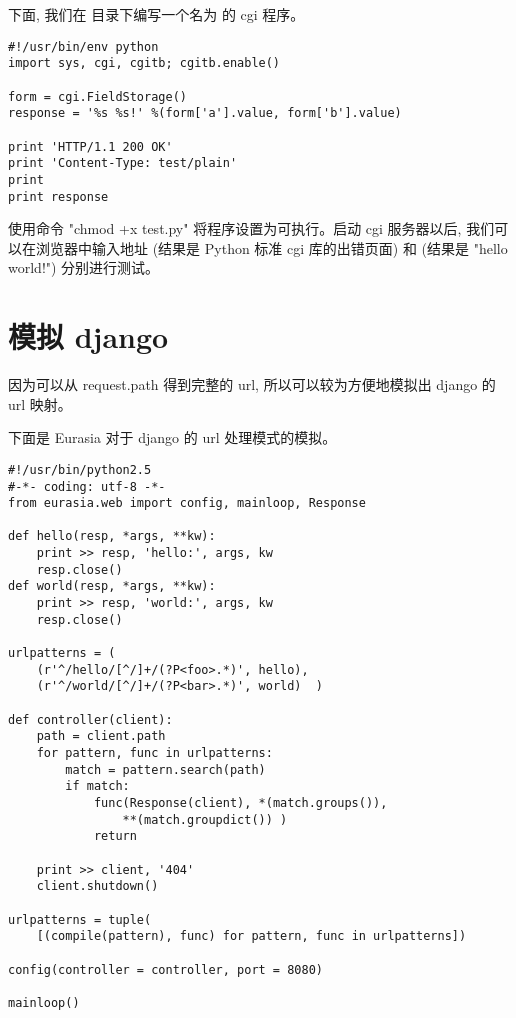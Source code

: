 \documentclass{manual}
\begin{document}
下面, 我们在  目录下编写一个名为  的 cgi 程序。

\begin{verbatim}
#!/usr/bin/env python
import sys, cgi, cgitb; cgitb.enable()

form = cgi.FieldStorage()
response = '%s %s!' %(form['a'].value, form['b'].value)

print 'HTTP/1.1 200 OK'
print 'Content-Type: test/plain'
print
print response
\end{verbatim}

使用命令 "chmod +x test.py" 将程序设置为可执行。启动 cgi 服务器以后, 我们可以在浏览器中输入地址  (结果是 Python 标准 cgi 库的出错页面) 和  (结果是 "hello world!") 分别进行测试。


\section{模拟 django}

因为可以从 request.path 得到完整的 url, 所以可以较为方便地模拟出 django 的 url 映射。

下面是 Eurasia 对于 django 的 url 处理模式的模拟。

\begin{verbatim}
#!/usr/bin/python2.5
#-*- coding: utf-8 -*-
from eurasia.web import config, mainloop, Response

def hello(resp, *args, **kw):
	print >> resp, 'hello:', args, kw
	resp.close()
def world(resp, *args, **kw):
	print >> resp, 'world:', args, kw
	resp.close()

urlpatterns = (
	(r'^/hello/[^/]+/(?P<foo>.*)', hello),
	(r'^/world/[^/]+/(?P<bar>.*)', world)  )

def controller(client):
	path = client.path
	for pattern, func in urlpatterns:
		match = pattern.search(path)
		if match:
			func(Response(client), *(match.groups()),
				**(match.groupdict()) )
			return

	print >> client, '404'
	client.shutdown()

urlpatterns = tuple(
	[(compile(pattern), func) for pattern, func in urlpatterns])

config(controller = controller, port = 8080)

mainloop()
\end{verbatim}

\end{document}
